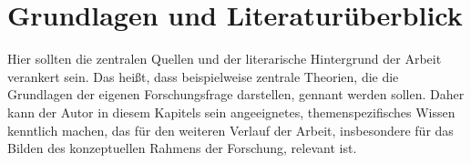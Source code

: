 
\chapter{Grundlagen und Literaturüberblick}
\label{chap:GrundlagenLiteraturüberblick}

Hier sollten die zentralen Quellen und der literarische Hintergrund der Arbeit verankert sein. 
Das heißt, dass beispielweise zentrale Theorien, die die Grundlagen der eigenen Forschungsfrage darstellen, gennant werden sollen.
Daher kann der Autor in diesem Kapitels sein angeeignetes, themenspezifisches Wissen kenntlich machen, das für den weiteren Verlauf der Arbeit, insbesondere für das Bilden des konzeptuellen Rahmens der Forschung, relevant ist.






